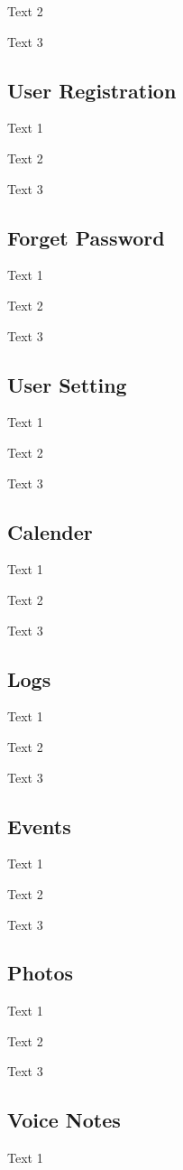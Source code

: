 Text 2

Text 3

\subsection{User Registration} \label{sec:d3.4}
Text 1

Text 2

Text 3

\subsection{Forget Password} \label{sec:d3.5}
Text 1

Text 2

Text 3

\subsection{User Setting} \label{sec:d3.6}
Text 1

Text 2

Text 3

\subsection{Calender} \label{sec:d3.7}
Text 1

Text 2

Text 3

\subsection{Logs} \label{sec:d3.8}
Text 1

Text 2

Text 3

\subsection{Events} \label{sec:d3.9}
Text 1

Text 2

Text 3

\subsection{Photos} \label{sec:d3.10}
Text 1

Text 2

Text 3

\subsection{Voice Notes} \label{sec:d3.11}
Text 1


